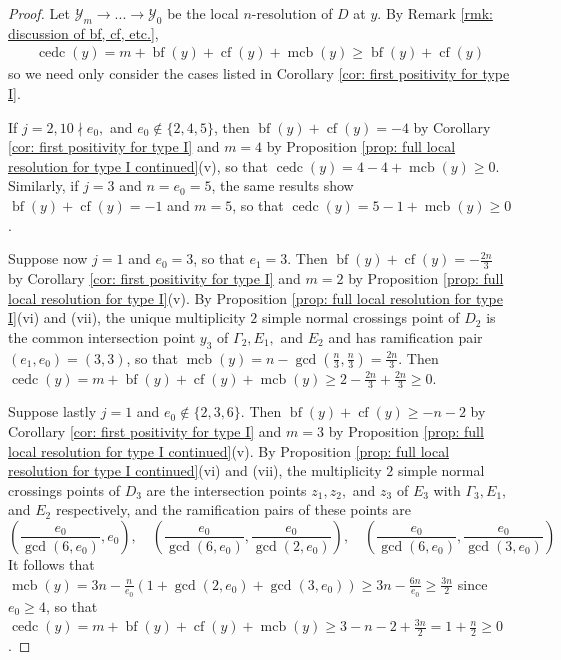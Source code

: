 \documentclass[12pt]{amsart}
\numberwithin{equation}{section}
\theoremstyle{definition}
\newcommand{\Y}{\mathcal{Y}}
\DeclareMathOperator{\blf}{bf}
\DeclareMathOperator{\cf}{cf}
\DeclareMathOperator{\mcb}{mcb}
\DeclareMathOperator{\cedc}{cedc}
\begin{document}
\begin{proof}
    Let $\Y_m\to...\to\Y_0$ be the local $n$-resolution of $D$ at $y$. By Remark \ref{rmk: discussion of bf, cf, etc.}, 
    \begin{align*}
        \cedc(y)=m+\blf(y)+\cf(y)+\mcb(y)\geq\blf(y)+\cf(y)
    \end{align*}    
    so we need only consider the cases listed in Corollary \ref{cor: first positivity for type I}. 

    If $j=2, 10\nmid e_0,$ and $e_0\not\in\{2,4,5\}$, then $\blf(y)+\cf(y)=-4$ by Corollary \ref{cor: first positivity for type I} and $m=4$ by Proposition \ref{prop: full local resolution for type I continued}(v), so that $\cedc(y)=4-4+\mcb(y)\geq0$. Similarly, if $j=3$ and $n=e_0=5$, the same results show $\blf(y)+\cf(y)=-1$ and $m=5$, so that $\cedc(y)=5-1+\mcb(y)\geq0$.

    Suppose now $j=1$ and $e_0=3$, so that $e_1=3$. Then $\blf(y)+\cf(y)=-\frac{2n}{3}$ by Corollary \ref{cor: first positivity for type I} and $m=2$ by Proposition \ref{prop: full local resolution for type I}(v). By Proposition \ref{prop: full local resolution for type I}(vi) and (vii), the unique multiplicity $2$ simple normal crossings point of $D_2$ is the common intersection point $y_{3}$ of $\Gamma_2, E_1,$ and $E_2$ and has ramification pair $(e_1,e_0)=(3,3)$, so that $\mcb(y)=n-\gcd(\frac{n}{3},\frac{n}{3})=\frac{2n}{3}$. Then $\cedc(y)=m+\blf(y)+\cf(y)+\mcb(y)\geq 2-\frac{2n}{3}+\frac{2n}{3}\geq0$.

    Suppose lastly $j=1$ and $e_0\not\in\{2,3,6\}$. Then $\blf(y)+\cf(y)\geq-n-2$ by Corollary \ref{cor: first positivity for type I} and $m=3$ by Proposition \ref{prop: full local resolution for type I continued}(v). By Proposition \ref{prop: full local resolution for type I continued}(vi) and (vii), the  multiplicity $2$ simple normal crossings points of $D_3$ are the intersection points $z_1,z_2,$ and $z_3$ of $E_3$ with $\Gamma_3,E_1,$ and $E_2$ respectively, and the ramification pairs of these points are \[(\frac{e_0}{\gcd(6,e_0)},e_0),\quad(\frac{e_0}{\gcd(6,e_0)},\frac{e_0}{\gcd(2,e_0)}),\quad(\frac{e_0}{\gcd(6,e_0)},\frac{e_0}{\gcd(3,e_0)})\]
    It follows that $\mcb(y)=3n-\frac{n}{e_0}(1+\gcd(2,e_0)+\gcd(3,e_0))\geq 3n-\frac{6n}{e_0}\geq\frac{3n}{2}$ since $e_0\geq 4$, so that $\cedc(y)=m+\blf(y)+\cf(y)+\mcb(y)\geq 3-n-2+\frac{3n}{2}=1+\frac{n}{2}\geq0$.   
\end{proof}
\end{document}
